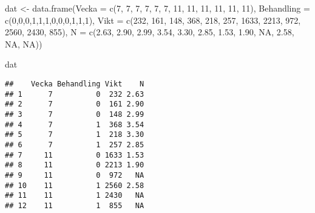 \documentclass[
]{book}
\newenvironment{Shaded}{\begin{snugshade}}{\end{snugshade}}
\newcommand{\AttributeTok}[1]{\textcolor[rgb]{0.77,0.63,0.00}{#1}}
\newcommand{\ConstantTok}[1]{\textcolor[rgb]{0.00,0.00,0.00}{#1}}
\newcommand{\DecValTok}[1]{\textcolor[rgb]{0.00,0.00,0.81}{#1}}
\newcommand{\FloatTok}[1]{\textcolor[rgb]{0.00,0.00,0.81}{#1}}
\newcommand{\FunctionTok}[1]{\textcolor[rgb]{0.00,0.00,0.00}{#1}}
\newcommand{\NormalTok}[1]{#1}
\newcommand{\OtherTok}[1]{\textcolor[rgb]{0.56,0.35,0.01}{#1}}
\theoremstyle{definition}
\theoremstyle{definition}
\theoremstyle{definition}
\theoremstyle{definition}
\theoremstyle{remark}
\begin{document}
\begin{Shaded}
\begin{Highlighting}[]
\NormalTok{dat }\OtherTok{\textless{}{-}} \FunctionTok{data.frame}\NormalTok{(}\AttributeTok{Vecka =} \FunctionTok{c}\NormalTok{(}\DecValTok{7}\NormalTok{, }\DecValTok{7}\NormalTok{, }\DecValTok{7}\NormalTok{, }\DecValTok{7}\NormalTok{, }\DecValTok{7}\NormalTok{, }\DecValTok{7}\NormalTok{, }
                            \DecValTok{11}\NormalTok{, }\DecValTok{11}\NormalTok{, }\DecValTok{11}\NormalTok{, }\DecValTok{11}\NormalTok{, }\DecValTok{11}\NormalTok{, }\DecValTok{11}\NormalTok{),}
                  \AttributeTok{Behandling =} \FunctionTok{c}\NormalTok{(}\DecValTok{0}\NormalTok{,}\DecValTok{0}\NormalTok{,}\DecValTok{0}\NormalTok{,}\DecValTok{1}\NormalTok{,}\DecValTok{1}\NormalTok{,}\DecValTok{1}\NormalTok{,}\DecValTok{0}\NormalTok{,}\DecValTok{0}\NormalTok{,}\DecValTok{0}\NormalTok{,}\DecValTok{1}\NormalTok{,}\DecValTok{1}\NormalTok{,}\DecValTok{1}\NormalTok{),}
                  \AttributeTok{Vikt =} \FunctionTok{c}\NormalTok{(}\DecValTok{232}\NormalTok{, }\DecValTok{161}\NormalTok{, }\DecValTok{148}\NormalTok{, }\DecValTok{368}\NormalTok{, }\DecValTok{218}\NormalTok{, }\DecValTok{257}\NormalTok{, }
                           \DecValTok{1633}\NormalTok{, }\DecValTok{2213}\NormalTok{, }\DecValTok{972}\NormalTok{, }\DecValTok{2560}\NormalTok{, }\DecValTok{2430}\NormalTok{, }\DecValTok{855}\NormalTok{),}
                  \AttributeTok{N =} \FunctionTok{c}\NormalTok{(}\FloatTok{2.63}\NormalTok{, }\FloatTok{2.90}\NormalTok{, }\FloatTok{2.99}\NormalTok{, }\FloatTok{3.54}\NormalTok{, }\FloatTok{3.30}\NormalTok{, }
                        \FloatTok{2.85}\NormalTok{, }\FloatTok{1.53}\NormalTok{, }\FloatTok{1.90}\NormalTok{, }\ConstantTok{NA}\NormalTok{, }\FloatTok{2.58}\NormalTok{, }\ConstantTok{NA}\NormalTok{, }\ConstantTok{NA}\NormalTok{))}

\NormalTok{dat}
\end{Highlighting}
\end{Shaded}

\begin{verbatim}
##    Vecka Behandling Vikt    N
## 1      7          0  232 2.63
## 2      7          0  161 2.90
## 3      7          0  148 2.99
## 4      7          1  368 3.54
## 5      7          1  218 3.30
## 6      7          1  257 2.85
## 7     11          0 1633 1.53
## 8     11          0 2213 1.90
## 9     11          0  972   NA
## 10    11          1 2560 2.58
## 11    11          1 2430   NA
## 12    11          1  855   NA
\end{verbatim}
\end{document}

